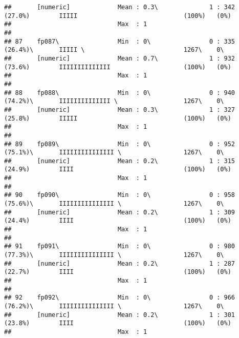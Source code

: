 \documentclass[]{article}
\begin{document}
\begin{verbatim}
##       [numeric]             Mean : 0.3\              1 : 342 (27.0%)        IIIII                             (100%)   (0%)     
##                             Max  : 1                                                                                            
## 
## 87    fp087\                Min  : 0\                0 : 335 (26.4%)\       IIIII \                           1267\    0\       
##       [numeric]             Mean : 0.7\              1 : 932 (73.6%)        IIIIIIIIIIIIII                    (100%)   (0%)     
##                             Max  : 1                                                                                            
## 
## 88    fp088\                Min  : 0\                0 : 940 (74.2%)\       IIIIIIIIIIIIII \                  1267\    0\       
##       [numeric]             Mean : 0.3\              1 : 327 (25.8%)        IIIII                             (100%)   (0%)     
##                             Max  : 1                                                                                            
## 
## 89    fp089\                Min  : 0\                0 : 952 (75.1%)\       IIIIIIIIIIIIIII \                 1267\    0\       
##       [numeric]             Mean : 0.2\              1 : 315 (24.9%)        IIII                              (100%)   (0%)     
##                             Max  : 1                                                                                            
## 
## 90    fp090\                Min  : 0\                0 : 958 (75.6%)\       IIIIIIIIIIIIIII \                 1267\    0\       
##       [numeric]             Mean : 0.2\              1 : 309 (24.4%)        IIII                              (100%)   (0%)     
##                             Max  : 1                                                                                            
## 
## 91    fp091\                Min  : 0\                0 : 980 (77.3%)\       IIIIIIIIIIIIIII \                 1267\    0\       
##       [numeric]             Mean : 0.2\              1 : 287 (22.7%)        IIII                              (100%)   (0%)     
##                             Max  : 1                                                                                            
## 
## 92    fp092\                Min  : 0\                0 : 966 (76.2%)\       IIIIIIIIIIIIIII \                 1267\    0\       
##       [numeric]             Mean : 0.2\              1 : 301 (23.8%)        IIII                              (100%)   (0%)     
##                             Max  : 1                                                                                            

\end{verbatim}
\end{document}
